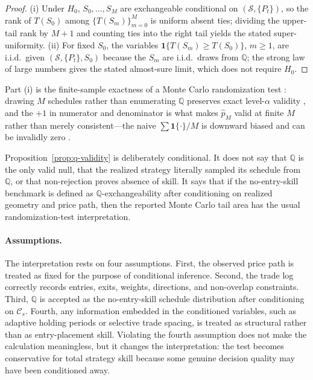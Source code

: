 \documentclass[preprint,12pt]{elsarticle}
\theoremstyle{definition}
\begin{document}
\begin{proof}
(i) Under $H_0$, $S_0,\ldots,S_M$ are exchangeable conditional on $(\mathcal{S},\{P_t\})$, so the rank of $T(S_0)$ among $\{T(S_m)\}_{m=0}^{M}$ is uniform absent ties; dividing the upper-tail rank by $M+1$ and counting ties into the right tail yields the stated super-uniformity. (ii) For fixed $S_0$, the variables $\mathbf{1}\{T(S_m)\ge T(S_0)\}$, $m\ge 1$, are i.i.d.\ given $(\mathcal{S},\{P_t\},S_0)$ because the $S_m$ are i.i.d.\ draws from $\mathbb{Q}$; the strong law of large numbers gives the stated almost-sure limit, which does not require $H_0$.
\end{proof}

Part (i) is the finite-sample exactness of a Monte Carlo randomization test \cite{Dwass1957,Hope1968}: drawing $M$ schedules rather than enumerating $\mathbb{Q}$ preserves exact level-$\alpha$ validity \cite{HemerikGoeman2018}, and the $+1$ in numerator and denominator is what makes $\hat p_M$ valid at finite $M$ rather than merely consistent---the naive $\sum\mathbf 1\{\cdot\}/M$ is downward biased and can be invalidly zero \cite{PhipsonSmyth2010}.

Proposition~\ref{prop:q-validity} is deliberately conditional. It does not say that $\mathbb{Q}$ is the only valid null, that the realized strategy literally sampled its schedule from $\mathbb{Q}$, or that non-rejection proves absence of skill. It says that if the no-entry-skill benchmark is defined as $\mathbb{Q}$-exchangeability after conditioning on realized geometry and price path, then the reported Monte Carlo tail area has the usual randomization-test interpretation.

\paragraph{Assumptions.} The interpretation rests on four assumptions. First, the observed price path is treated as fixed for the purpose of conditional inference. Second, the trade log correctly records entries, exits, weights, directions, and non-overlap constraints. Third, $\mathbb{Q}$ is accepted as the no-entry-skill schedule distribution after conditioning on $\mathcal{C}_s$. Fourth, any information embedded in the conditioned variables, such as adaptive holding periods or selective trade spacing, is treated as structural rather than as entry-placement skill. Violating the fourth assumption does not make the calculation meaningless, but it changes the interpretation: the test becomes conservative for total strategy skill because some genuine decision quality may have been conditioned away.
\end{document}
